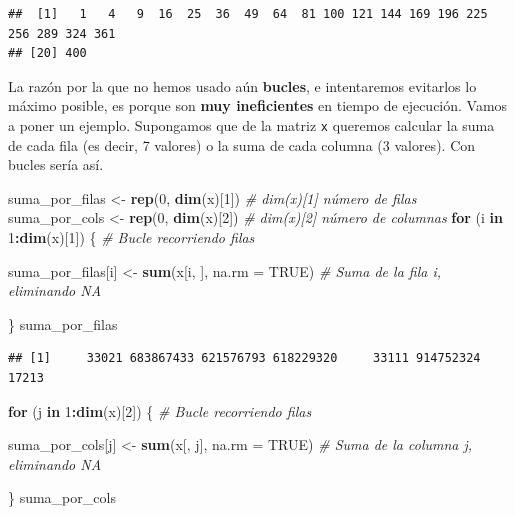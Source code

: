 \documentclass[11pt,]{book}
\newenvironment{Shaded}{\begin{snugshade}}{\end{snugshade}}
\newcommand{\CommentTok}[1]{\textcolor[rgb]{0.37,0.37,0.37}{\textit{#1}}}
\newcommand{\ControlFlowTok}[1]{\textcolor[rgb]{0.27,0.27,0.27}{\textbf{#1}}}
\newcommand{\DataTypeTok}[1]{\textcolor[rgb]{0.27,0.27,0.27}{#1}}
\newcommand{\DecValTok}[1]{\textcolor[rgb]{0.06,0.06,0.06}{#1}}
\newcommand{\KeywordTok}[1]{\textcolor[rgb]{0.27,0.27,0.27}{\textbf{#1}}}
\newcommand{\NormalTok}[1]{#1}
\newcommand{\OperatorTok}[1]{\textcolor[rgb]{0.43,0.43,0.43}{\textbf{#1}}}
\newcommand{\OtherTok}[1]{\textcolor[rgb]{0.37,0.37,0.37}{#1}}
\newcommand{\StringTok}[1]{\textcolor[rgb]{0.5,0.5,0.5}{#1}}
\begin{document}
\begin{verbatim}
##  [1]   1   4   9  16  25  36  49  64  81 100 121 144 169 196 225 256 289 324 361
## [20] 400
\end{verbatim}

La razón por la que no hemos usado aún \textbf{bucles}, e intentaremos evitarlos lo máximo posible, es porque son \textbf{muy ineficientes} en tiempo de ejecución. Vamos a poner un ejemplo. Supongamos que de la matriz \texttt{x} queremos calcular la suma de cada fila (es decir, 7 valores) o la suma de cada columna (3 valores). Con bucles sería así.

\begin{Shaded}
\begin{Highlighting}[]
\NormalTok{suma_por_filas <-}\StringTok{ }\KeywordTok{rep}\NormalTok{(}\DecValTok{0}\NormalTok{, }\KeywordTok{dim}\NormalTok{(x)[}\DecValTok{1}\NormalTok{]) }\CommentTok{# dim(x)[1] número de filas}
\NormalTok{suma_por_cols <-}\StringTok{ }\KeywordTok{rep}\NormalTok{(}\DecValTok{0}\NormalTok{, }\KeywordTok{dim}\NormalTok{(x)[}\DecValTok{2}\NormalTok{]) }\CommentTok{# dim(x)[2] número de columnas}
\ControlFlowTok{for}\NormalTok{ (i }\ControlFlowTok{in} \DecValTok{1}\OperatorTok{:}\KeywordTok{dim}\NormalTok{(x)[}\DecValTok{1}\NormalTok{]) \{ }\CommentTok{# Bucle recorriendo filas}

\NormalTok{  suma_por_filas[i] <-}\StringTok{ }\KeywordTok{sum}\NormalTok{(x[i, ], }\DataTypeTok{na.rm =} \OtherTok{TRUE}\NormalTok{) }\CommentTok{# Suma de la fila i, eliminando NA}
    
\NormalTok{\}}
\NormalTok{suma_por_filas}
\end{Highlighting}
\end{Shaded}

\begin{verbatim}
## [1]     33021 683867433 621576793 618229320     33111 914752324     17213
\end{verbatim}

\begin{Shaded}
\begin{Highlighting}[]
\ControlFlowTok{for}\NormalTok{ (j }\ControlFlowTok{in} \DecValTok{1}\OperatorTok{:}\KeywordTok{dim}\NormalTok{(x)[}\DecValTok{2}\NormalTok{]) \{ }\CommentTok{# Bucle recorriendo filas}

\NormalTok{  suma_por_cols[j] <-}\StringTok{ }\KeywordTok{sum}\NormalTok{(x[, j], }\DataTypeTok{na.rm =} \OtherTok{TRUE}\NormalTok{) }\CommentTok{# Suma de la columna j, eliminando NA}
    
\NormalTok{\}}
\NormalTok{suma_por_cols}
\end{Highlighting}
\end{Shaded}
\end{document}
